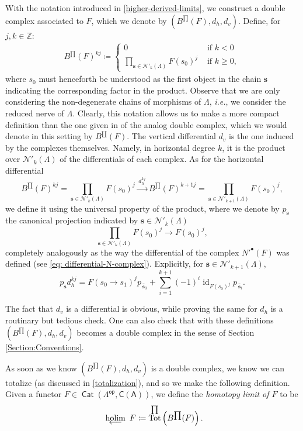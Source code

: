 \documentclass[reqno,11pt]{amsart}
\theoremstyle{plain}
\theoremstyle{remark}
\theoremstyle{definition}
\numberwithin{equation}{thm}
\newcommand{\CN}{\mathcal{N}}
\newcommand{\SA}{\mathsf{A}}
\newcommand{\CCC}{\boldsymbol{\mathsf{C}}}
\newcommand{\ZZ}{\mathbb{Z}}
\newcommand{\holim}[1]{\begin{array}[t]{c} {\rm holim}\\[-7.5 pt]
		{\longleftarrow} \end{array}}
\newcommand{\lto}{\longrightarrow}
\DeclareMathOperator{\Tot}{Tot}
\DeclareMathOperator{\id}{id}
\newcommand{\op}{\mathsf{op}}
\DeclareMathOperator{\cat}{\mathsf{Cat}}
\begin{document}
	With the notation introduced in \ref{higher-derived-limits}, we construct a double complex associated to $F$, which we denote by $\left(B^{\prod}(F),d_h,d_v\right)$. Define, for $j, k \in \ZZ$:
	\begin{equation*}
		\begin{aligned}
			B^{\prod}(F)^{kj} \coloneqq \begin{cases}
				0 &\text{ if } k < 0 \\
					\prod_{ \textbf{s} \in \CN'_k(\Lambda)} F(s_0)^j &\text{ if } k \geq 0,
				\end{cases}
		\end{aligned}
	\end{equation*}
	where $s_0$ must henceforth be understood as the first object in the chain $\textbf{s}$ indicating the corresponding factor in the product. Observe that we are only considering the non-degenerate chains of morphisms of $\Lambda$, \textit{i.e.}, we consider the reduced nerve of $\Lambda$. Clearly, this notation allows us to make a more compact definition than the one given in \cite{AJS} of the analog double complex, which we would denote in this setting by $B^{\coprod}(F)$. The vertical differential $d_v$ is the one induced by the complexes themselves. Namely, in horizontal degree $k$, it is the product over $\CN'_k(\Lambda)$ of the differentials of each complex. As for the horizontal differential 
	\[
		B^{\prod}(F)^{kj} = \prod_{ \textbf{s} \in \CN'_k(\Lambda)}F(s_0)^j \xrightarrow{\,d_h^{kj}\,} B^{\prod}(F)^{k+1j} = \prod_{ \textbf{s} \in \CN'_{k+1}(\Lambda)}F(s_0)^j,
	\] we define it using the universal property of the product, where we denote by $p_{\textbf{s}}$ the canonical projection indicated by $\textbf{s} \in \CN'_k(\Lambda)$
	\[
		\prod_{\textbf{s} \in \CN'_k(\Lambda)}F(s_0)^j \lto F(s_0)^j,
	\]
	completely analogously as the way the differential of the complex $N'^\bullet(F)$ was defined (see \ref{eq: differential-N-complex}). Explicitly, for $\textbf{s} \in \CN'_{k+1}(\Lambda)$,
	\[ p_{\textbf{s}}d_h^{kj} = F(s_0 \to s_1)^j p_{\,\widehat{\textbf{s}}_0} + \sum_{i=1}^{k+1} (-1)^i \id_{F(s_0)^j} p_{\,\widehat{\textbf{s}}_i}.\]
	
	The fact that $d_v$ is a differential is obvious, while proving the same for $d_h$ is a routinary but tedious check. One can also check that with these definitions $(B^{\prod}(F),d_h,d_v)$ becomes a double complex in the sense of Section \ref{Section:Conventions}. 
	
	As soon as we know $(B^{\prod}(F),d_h,d_v)$ is a double complex, we know we can totalize (as discussed in \ref{totalization}), and so we make the following definition. Given a functor $F \in \cat(\Lambda^\op, \CCC(\SA))$, we define the \textit{homotopy limit of $F$} to be 
	\[ \holim{}F \coloneqq \Tot^{\prod}\left(B^{\prod}(F)\right). \]
	
\end{document}
